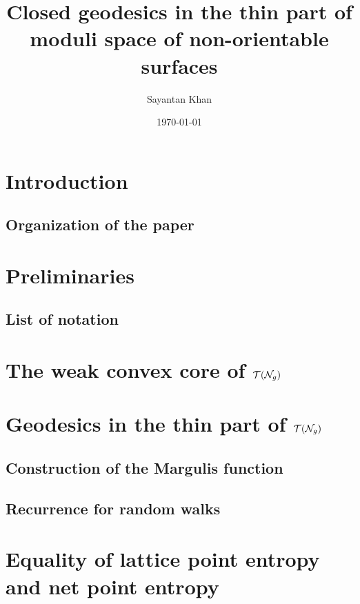 \documentclass[12pt, reqno]{amsart}
\title{Closed geodesics in the thin part of moduli space of non-orientable surfaces}
\author{Sayantan Khan}
\date{\today}
\begin{document}
\begin{abstract}

\end{abstract}
\maketitle

\section{Introduction}
\label{sec:introduction}

\subsection*{Organization of the paper}

\section{Preliminaries}
\label{sec:preliminaries}

\subsection*{List of notation}


\section{The weak convex core of $\mathcal{T}(\mathcal{N}_g)$}
\label{sec:weak-convex-core}


\section{Geodesics in the thin part of $\mathcal{T}(\mathcal{N}_g)$}
\label{sec:recurr-rand-walks}


\subsection{Construction of the Margulis function}
\label{sec:constr-marg-funct}

\subsection{Recurrence for random walks}
\label{sec:recurr-rand-walks-1}

\section{Equality of lattice point entropy and net point entropy}
\label{sec:equal-latt-point}
\end{document}
